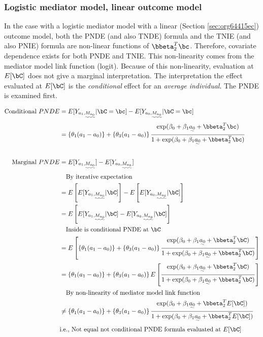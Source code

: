 \documentclass[10pt]{article}
\begin{document}
\subsubsection{Logistic mediator model, linear outcome model}
\label{sec:org4c7fbe4}
In the case with a logistic mediator model with a linear (Section \ref{sec:org64415ec}) outcome model, both the PNDE (and also TNDE) formula and the TNIE (and also PNIE) formula are non-linear functions of \(\bbeta_{2}^{T}\bc\). Therefore, covariate dependence exists for both PNDE and TNIE. This non-linearity comes from the mediator model link function (logit). Because of this non-linearity, evaluation at \(E[\bC]\) does not give a marginal interpretation. The interpretation the effect evaluated at \(E[\bC]\) is the \emph{conditional} effect for an \emph{average individual}. The PNDE is examined first.

\begin{align*}
  \text{Conditional }PNDE
  &= E[Y_{a_{1},\uwave{M_{a_{0}}}} | \bC = \bc] - E[Y_{a_{0},\uwave{M_{a_{0}}}} | \bC = \bc]\\
  &= \left\{\theta_{1}(a_{1} - a_{0}) \right\} + \left\{\theta_{3}(a_{1} - a_{0}) \right\}
    \frac
    {    \exp(\beta_{0} + \beta_{1}\uwave{a_{0}} + \bbeta_{2}^{T}\bc)}
    {1 + \exp(\beta_{0} + \beta_{1}\uwave{a_{0}} + \bbeta_{2}^{T}\bc)}\\
  \\
  \text{Marginal }PNDE
  &= E[Y_{a_{1},\uwave{M_{a_{0}}}}] - E[Y_{a_{0},\uwave{M_{a_{0}}}}]\\
  &~~~\text{By iterative expectation}\\
  &= E \left[ E[Y_{a_{1},\uwave{M_{a_{0}}}} | \bC] \right] - E \left[ E[Y_{a_{0},\uwave{M_{a_{0}}}} | \bC] \right]\\
  &= E \left[ E[Y_{a_{1},\uwave{M_{a_{0}}}} | \bC] - E[Y_{a_{0},\uwave{M_{a_{0}}}} | \bC] \right]\\
  &~~~\text{Inside is conditional PNDE at }\bC\\
  &= E \left[ \left\{\theta_{1}(a_{1} - a_{0}) \right\} + \left\{\theta_{3}(a_{1} - a_{0}) \right\}
    \frac
    {    \exp(\beta_{0} + \beta_{1}\uwave{a_{0}} + \bbeta_{2}^{T}\bC)}
    {1 + \exp(\beta_{0} + \beta_{1}\uwave{a_{0}} + \bbeta_{2}^{T}\bC)} \right]\\
  &= \left\{\theta_{1}(a_{1} - a_{0}) \right\} + \left\{\theta_{3}(a_{1} - a_{0}) \right\}
    E \left[ \frac
    {    \exp(\beta_{0} + \beta_{1}\uwave{a_{0}} + \bbeta_{2}^{T}\bC)}
    {1 + \exp(\beta_{0} + \beta_{1}\uwave{a_{0}} + \bbeta_{2}^{T}\bC)} \right]\\
  &~~~\text{By non-linearity of mediator model link function}\\
  &\ne \left\{\theta_{1}(a_{1} - a_{0}) \right\} + \left\{\theta_{3}(a_{1} - a_{0}) \right\}
    \frac
    {    \exp(\beta_{0} + \beta_{1}\uwave{a_{0}} + \bbeta_{2}^{T}E[\bC])}
    {1 + \exp(\beta_{0} + \beta_{1}\uwave{a_{0}} + \bbeta_{2}^{T}E[\bC])}\\
  &\text{i.e., Not equal not conditional PNDE formula evaluated at }E[\bC]\\
\end{align*}
\end{document}
